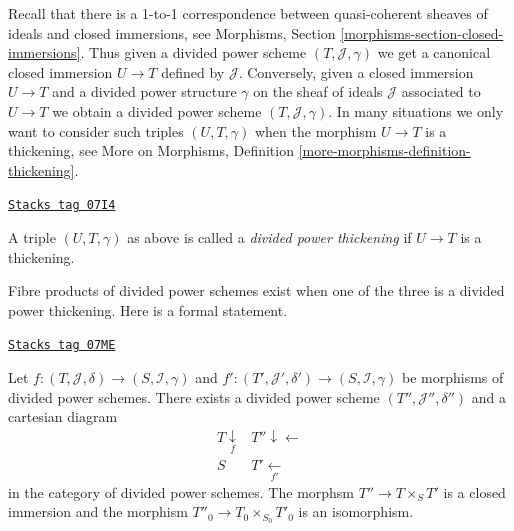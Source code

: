 Recall that there is a 1-to-1 correspondence between quasi-coherent
sheaves of ideals and closed immersions, see
Morphisms, Section \ref{morphisms-section-closed-immersions}.
Thus given a divided power scheme $(T, \mathcal{J}, \gamma)$ we
get a canonical closed immersion $U \to T$ defined by $\mathcal{J}$.
Conversely, given a closed immersion $U \to T$ and a divided power
structure $\gamma$ on the sheaf of ideals $\mathcal{J}$ associated
to $U \to T$ we obtain a divided power scheme $(T, \mathcal{J}, \gamma)$.
In many situations we only want to consider such triples
$(U, T, \gamma)$ when the morphism $U \to T$ is a thickening, see
More on Morphisms, Definition \ref{more-morphisms-definition-thickening}.

\begin{definition}
\label{crystalline-definition-divided-power-thickening}
\href{https://stacks.math.columbia.edu/tag/07I4}{\texttt{Stacks tag 07I4}}

A triple $(U, T, \gamma)$ as above is called a {\it divided power thickening}
if $U \to T$ is a thickening.
\end{definition}

Fibre products of divided power schemes exist when one of the
three is a divided power thickening. Here is a formal statement.

\begin{lemma}
\label{crystalline-lemma-fibre-product}
\href{https://stacks.math.columbia.edu/tag/07ME}{\texttt{Stacks tag 07ME}}

Let $f : (T, \mathcal{J}, \delta) \to (S, \mathcal{I}, \gamma)$ and
$f' : (T', \mathcal{J}', \delta') \to (S, \mathcal{I}, \gamma)$
be morphisms of divided power schemes. There exists a divided power scheme
$(T'', \mathcal{J}'', \delta'')$ and a cartesian diagram
$$
\begin{array}{cc}T \underset{f}{\downarrow} & T'' \downarrow\longleftarrow \\ S & T' \underset{f'}{\longleftarrow}\end{array}
$$
in the category of divided power schemes. The morphsm
$T'' \to T \times_S T'$ is a closed immersion and the morphism
$T''_0 \to T_0 \times_{S_0} T'_0$ is an isomorphism.
\end{lemma}

